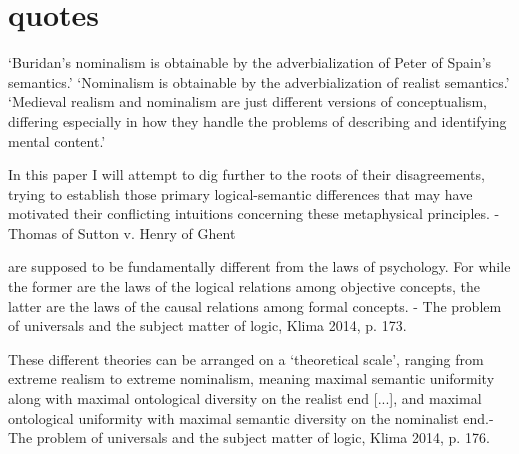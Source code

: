 \documentclass[]{article}
\begin{document}
\section{quotes}

`Buridan’s nominalism is obtainable by the adverbialization of Peter
of Spain’s semantics.'
`Nominalism is obtainable by the adverbialization of realist
semantics.'
`Medieval realism and nominalism are just different versions of conceptualism, differing especially in how they handle the problems of
describing and identifying mental content.'\autocite[110]{Klima2011}

In this paper I will attempt to dig further to the roots of
their disagreements, trying to establish those primary logical-semantic differences that may have
motivated their conflicting intuitions concerning these metaphysical principles. - Thomas of Sutton v. Henry of Ghent

are supposed to be fundamentally diﬀerent from the laws of psychology.
For while the former are the laws of the logical relations among objective
concepts, the latter are the laws of the causal relations among formal
concepts. - The problem of universals and the subject matter of logic, Klima 2014, p. 173.

These different theories can be arranged on a `theoretical scale', ranging from extreme realism to extreme nominalism, meaning maximal semantic uniformity along with maximal ontological diversity on the realist end [...], and maximal ontological uniformity with maximal semantic diversity on the nominalist end.- The problem of universals and the subject matter of logic, Klima 2014, p. 176.
\end{document}
